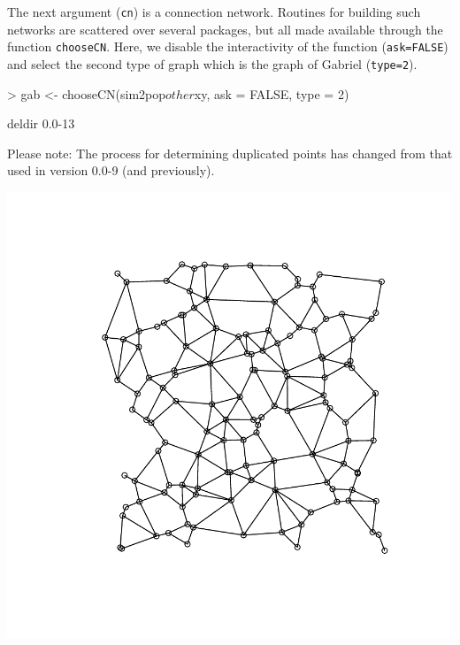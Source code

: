 \documentclass{article}
\begin{document}
\noindent The next argument (\texttt{cn}) is a connection network.
Routines for building such networks are scattered over several packages, but all made available
through the function \texttt{chooseCN}.
Here, we disable the interactivity of the function (\texttt{ask=FALSE}) and select the second type of graph which is the graph of Gabriel (\texttt{type=2}).
\begin{Schunk}
\begin{Sinput}
> gab <- chooseCN(sim2pop$other$xy, ask = FALSE, type = 2)
\end{Sinput}
\begin{Soutput}
deldir 0.0-13 

     Please note: The process for determining duplicated points
     has changed from that used in version 0.0-9 (and previously).
\end{Soutput}
\end{Schunk}
\includegraphics{figs/base-mon4}
\end{document}
